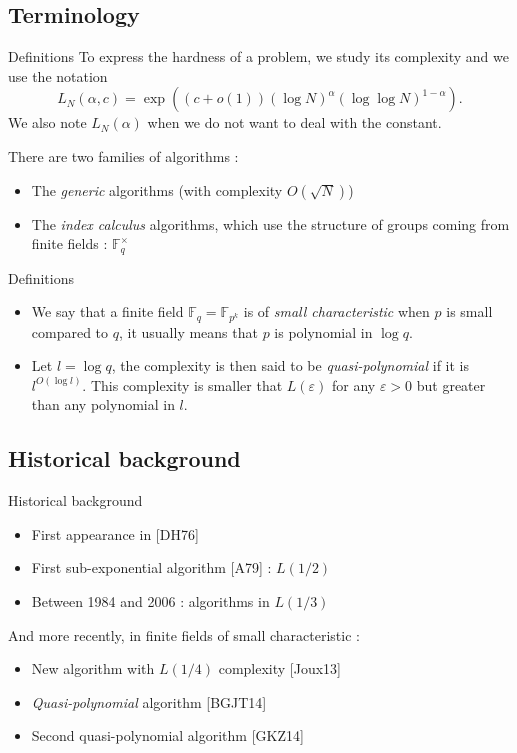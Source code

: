 \documentclass[xcolor=x11names,compress]{beamer}
\theoremstyle{break}
\theoremstyle{sc}
\theoremstyle{definition}
\theoremstyle{remark}
\begin{document}
\subsection{Terminology}
\begin{frame}{Definitions}
  To express the hardness of a problem, we study its complexity and we use the
  notation
  \[
    L_N(\alpha, c) = \exp((c+o(1))(\log N)^\alpha(\log\log N)^{1-\alpha}).
  \]
  We also note $L_N(\alpha)$ when we do not want to deal with the constant.

  There are two families of algorithms :
  \begin{itemize}
    \item The \emph{generic} algorithms (with complexity $O(\sqrt N)$)
    \item The \emph{index calculus} algorithms, which use the structure
      of groups coming from finite fields : $\mathbb{F}_{q}^\times$
  \end{itemize}
\end{frame}

\begin{frame}{Definitions}
  \begin{itemize}
    \item We say that a finite field $\mathbb{F}_q=\mathbb{F}_{p^k}$ is of
      \emph{small characteristic} when $p$ is small compared to $q$, it usually
      means that $p$ is polynomial in $\log q$.
    \item Let $l = \log q$, the complexity is then said to be
      \emph{quasi-polynomial} if it is
  $l^{O(\log l)}$. This complexity is smaller that $L(\varepsilon)$ for any
  $\varepsilon>0$ but greater than any polynomial in $l$.
  \end{itemize}
\end{frame}

\subsection{Historical background}
\begin{frame}{Historical background}
  \begin{itemize}
    \item First appearance in [DH76]
    \item First sub-exponential algorithm [A79] : $L(1/2)$
    \item Between 1984 and 2006 : algorithms in $L(1/3)$
\end{itemize}
 And more recently, in finite fields of small characteristic :
  \begin{itemize}
    \item New algorithm with $L(1/4)$ complexity [Joux13]
    \item \emph{Quasi-polynomial} algorithm [BGJT14]
    \item Second quasi-polynomial algorithm [GKZ14]
  \end{itemize}
\end{frame}
\end{document}
